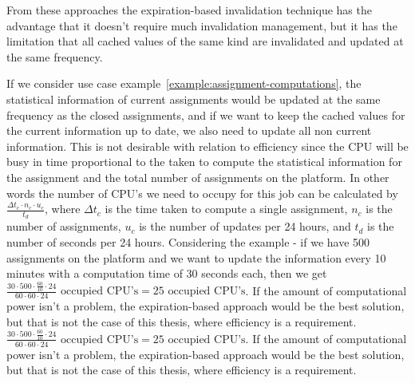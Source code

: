 From these approaches the expiration-based invalidation technique has the advantage that it doesn't require much invalidation management, but it has the limitation that all cached values of the same kind are invalidated and updated at the same frequency.

If we consider use case example~\ref{example:assignment-computations}, the statistical information of current assignments would be updated at the same frequency as the closed assignments, and if we want to keep the cached values for the current information up to date, we also need to update all non current information. This is not desirable with relation to efficiency since the CPU will be busy in time proportional to the taken to compute the statistical information for the assignment and the total number of assignments on the platform. In other words the number of CPU's we need to occupy for this job can be calculated by $\frac{\Delta t_c \cdot n_c \cdot u_c}{t_d}$, where $\Delta t_c$ is the time taken to compute a single assignment, $n_c$ is the number of assignments, $u_c$ is the number of updates per 24 hours, and $t_d$ is the number of seconds per 24 hours. Considering the example - if we have 500 assignments on the platform and we want to update the information every 10 minutes with a computation time of 30 seconds each, then we get $\frac{30 \cdot 500 \cdot \frac{60}{10} \cdot 24}{60 \cdot 60 \cdot 24}\text{ occupied CPU's} = 25\text{ occupied CPU's}$. If the amount of computational power isn't a problem, the expiration-based approach would be the best solution, but that is not the case of this thesis, where efficiency is a requirement.
$\frac{30 \cdot 500 \cdot \frac{60}{10} \cdot 24}{60 \cdot 60 \cdot 24}\text{ occupied CPU's} = 25\text{ occupied CPU's}$. If the amount of computational power isn't a problem, the expiration-based approach would be the best solution, but that is not the case of this thesis, where efficiency is a requirement.

